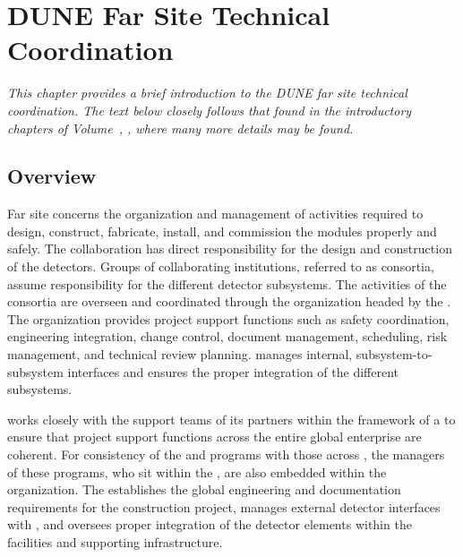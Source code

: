\chapter{DUNE Far Site Technical Coordination}
\label{ch:exec-tc}

\textit{This chapter provides a brief introduction to the DUNE far site technical coordination.  The text below closely follows that found in the introductory chapters of Volume~\volnumbertc{}, \voltitletc{}, where many more details may be found.}

\section{Overview}

Far site  concerns the organization and management of 
activities required to design, construct,
fabricate, install, and commission the   modules properly and safely. 
      The  collaboration has direct responsibility for the design 
and construction of the  detectors.  Groups of collaborating 
institutions, referred to as consortia, assume responsibility for 
the different detector subsystems.  The activities of the consortia are 
overseen and coordinated through the   organization 
headed by the  .  The  organization 
provides project support functions such as safety coordination, 
engineering integration, change control, document management, scheduling, 
risk management, and technical review planning.    
manages internal, subsystem-to-subsystem interfaces and ensures the proper integration of the different subsystems.   

  works closely with the support teams of its 
 partners within the framework of a  to 
ensure that project support functions across the entire global 
enterprise are coherent.  For consistency of the   
and  programs with those across , the 
managers of these programs, who sit within 
the , are also embedded within the   
organization.  The  establishes the global engineering
and documentation requirements for the  
 construction project, manages external  detector 
interfaces with , and oversees proper 
integration of the  detector elements within the facilities 
and supporting infrastructure.  




